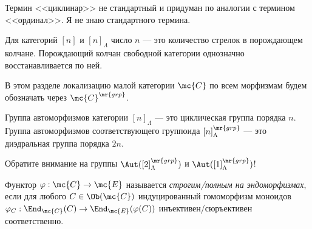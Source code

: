 \documentclass[
	extrafontsizes,
	11pt,
	hyphens,
]{memoir}
\begin{document}

\begin{remark}
Термин <<циклинар>> не стандартный и придуман по аналогии с термином <<ординал>>. Я не знаю стандартного термина.
\end{remark}

\begin{observation}
Для категорий \([n]\) и \([n]_\Lambda\) число \(n\) --- это количество стрелок в порождающем колчане.
Порождающий колчан свободной категории однозначно восстанавливается по ней.
\end{observation}

\begin{notation}
В этом разделе локализацию малой категории \(\mc{C}\) по всем морфизмам будем обозначать через
\(\mc{C}^\mr{grp}\).
\end{notation}

\begin{observation}
Группа автоморфизмов категории \([n]_\Lambda\) --- это циклическая группа порядка \(n\).
Группа автоморфизмов соответствующего группоида \([n]_\Lambda^\mr{grp}\) --- это диэдральная группа порядка \(2n\).
\end{observation}

\begin{remark}
Обратите внимание на группы \(\Aut([2]_\Lambda^\mr{grp})\) и \(\Aut([1]_\Lambda^\mr{grp})\)!
\end{remark}



\begin{definition}
Функтор \(\varphi : \mc{C} \to \mc{E}\) называется \emph{стро\-гим/пол\-ным на эндоморфизмах}, если для любого \(C \in \Ob(\mc{C})\) индуцированный гомоморфизм моноидов
\(\varphi_C : \End_\mc{C}(C) \to \End_\mc{E}(\varphi(C))\)
инъективен/сюръективен соответственно.
\end{definition}
\end{document}
